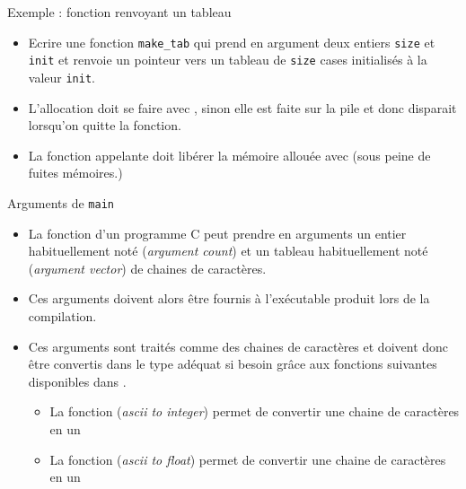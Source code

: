 \documentclass[10pt]{beamer}
\begin{document}
\begin{frame}[fragile]{\Ctitle}{\stitle}
	\begin{exampleblock}{Exemple : fonction renvoyant un tableau}
		\begin{itemize} \item<1-> Ecrire une fonction {\tt make\_tab} qui prend en argument deux entiers {\tt size} et {\tt init} et renvoie un pointeur vers un tableau de {\tt size} cases initialisés à la valeur {\tt init}.
				\onslide<2->
			\item<3-> \textcolor{BrickRed}{\small \danger} L'allocation \textcolor{BrickRed}{doit} se faire avec , sinon elle est faite sur la pile et donc disparait lorsqu'on quitte la fonction.
			\item<4-> La fonction appelante doit libérer la mémoire allouée avec  (sous peine de fuites mémoires.)
		\end{itemize}
	\end{exampleblock}
\end{frame}

\begin{frame}{\Ctitle}{\stitle}
	\begin{block}{Arguments de {\tt main}}
		\begin{itemize}
			\item<1-> La fonction  d'un programme C peut prendre en arguments un entier habituellement noté  (\textit{argument count}) et un tableau habituellement noté  (\textit{argument vector}) de chaines de caractères.
			\item<2-> Ces arguments doivent alors être fournis à l'exécutable produit lors de la compilation.
			\item<3-> Ces arguments sont traités comme des chaines de caractères et doivent donc être convertis dans le type adéquat si besoin grâce aux fonctions suivantes disponibles dans .
				\begin{itemize}
					\item<4-> La fonction  (\textit{{\sc ascii} to integer}) permet de convertir une chaine de caractères en un 
					\item<5-> La fonction  (\textit{{\sc ascii} to float}) permet de convertir une chaine de caractères en un 
				\end{itemize}

		\end{itemize}
	\end{block}
\end{frame}
\end{document}
